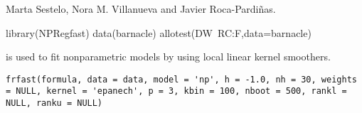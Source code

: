 %
\begin{Author}\relax
Marta Sestelo, Nora M. Villanueva and Javier Roca-Pardiñas.
\end{Author}
%
\begin{Examples}
\begin{ExampleCode}
library(NPRegfast)
data(barnacle)
allotest(DW~RC:F,data=barnacle)
\end{ExampleCode}
\end{Examples}

%
\begin{Description}\relax
{} is used to fit nonparametric models by using local linear kernel smoothers.
\end{Description}
%
\begin{Usage}
\begin{verbatim}
frfast(formula, data = data, model = 'np', h = -1.0, nh = 30, weights = NULL, kernel = 'epanech', p = 3, kbin = 100, nboot = 500, rankl = NULL, ranku = NULL)
\end{verbatim}
\end{Usage}
%

